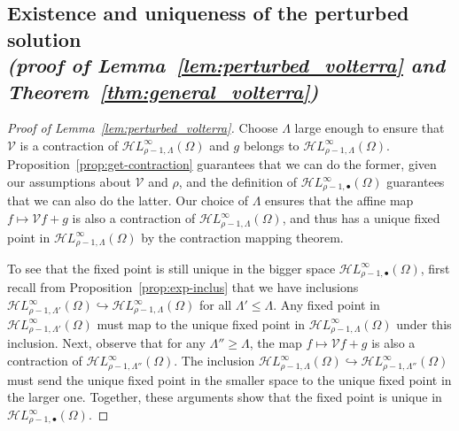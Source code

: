 \documentclass{article}
\theoremstyle{plain}
\newcommand{\singexp}[2]{\mathcal{H}L^\infty_{#1, #2}}
\newcommand{\singexpalg}[1]{\singexp{#1}{\bullet}}
\newcommand{\volterra}{\mathcal{V}}
\begin{document}
\subsection{Existence and uniqueness of the perturbed solution \\ \textit{(proof of Lemma~\ref{lem:perturbed_volterra} and Theorem~\ref{thm:general_volterra})}}\label{sec:existence and uniqueness}
\begin{proof}[Proof of Lemma~\ref{lem:perturbed_volterra}]
Choose $\Lambda$ large enough to ensure that $\volterra$ is a contraction of $\singexp{\rho-1}{\Lambda}(\Omega)$ and $g$ belongs to $\singexp{\rho-1}{\Lambda}(\Omega)$. Proposition~\ref{prop:get-contraction} guarantees that we can do the former, given our assumptions about $\volterra$ and $\rho$, and the definition of $\singexpalg{\rho-1}(\Omega)$ guarantees that we can also do the latter. Our choice of $\Lambda$ ensures that the affine map $f \mapsto \volterra f + g$ is also a contraction of $\singexp{\rho-1}{\Lambda}(\Omega)$, and thus has a unique fixed point in $\singexp{\rho-1}{\Lambda}(\Omega)$ by the contraction mapping theorem.

To see that the fixed point is still unique in the bigger space $\singexpalg{\rho-1}(\Omega)$, first recall from Proposition~\ref{prop:exp-inclus} that we have inclusions $\singexp{\rho-1}{\Lambda'}(\Omega) \hookrightarrow \singexp{\rho-1}{\Lambda}(\Omega)$ for all $\Lambda' \le \Lambda$. Any fixed point in $\singexp{\rho-1}{\Lambda'}(\Omega)$ must map to the unique fixed point in $\singexp{\rho-1}{\Lambda}(\Omega)$ under this inclusion. Next, observe that for any $\Lambda'' \ge \Lambda$, the map $f \mapsto \volterra f + g$ is also a contraction of $\singexp{\rho-1}{\Lambda''}(\Omega)$. The inclusion $\singexp{\rho-1}{\Lambda}(\Omega) \hookrightarrow \singexp{\rho-1}{\Lambda''}(\Omega)$ must send the unique fixed point in the smaller space to the unique fixed point in the larger one. Together, these arguments show that the fixed point is unique in $\singexpalg{\rho-1}(\Omega)$.
\end{proof}
\end{document}
